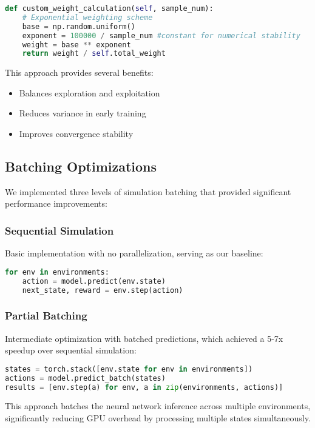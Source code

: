 \documentclass[11pt]{article}
\begin{document}
\begin{lstlisting}[language=Python]
def custom_weight_calculation(self, sample_num):
    # Exponential weighting scheme
    base = np.random.uniform()
    exponent = 100000 / sample_num #constant for numerical stability
    weight = base ** exponent
    return weight / self.total_weight
\end{lstlisting}

This approach provides several benefits:
\begin{itemize}
    \item Balances exploration and exploitation
    \item Reduces variance in early training
    \item Improves convergence stability
\end{itemize}

\subsection{Batching Optimizations}
We implemented three levels of simulation batching that provided significant performance improvements:

\subsubsection{Sequential Simulation}
Basic implementation with no parallelization, serving as our baseline:
\begin{lstlisting}[language=Python]
for env in environments:
    action = model.predict(env.state)
    next_state, reward = env.step(action)
\end{lstlisting}

\subsubsection{Partial Batching}
Intermediate optimization with batched predictions, which achieved a 5-7x speedup over sequential simulation:
\begin{lstlisting}[language=Python]
states = torch.stack([env.state for env in environments])
actions = model.predict_batch(states)
results = [env.step(a) for env, a in zip(environments, actions)]
\end{lstlisting}

This approach batches the neural network inference across multiple environments, significantly reducing GPU overhead by processing multiple states simultaneously.
\end{document}
